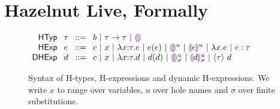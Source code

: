 
\clearpage
\newcommand{\calculusSec}{Hazelnut Live, Formally}
\section{\protect\calculusSec}
\label{sec:calculus}

\begin{figure}[!ht]
$\arraycolsep=4pt\begin{array}{rllllll}
\mathsf{HTyp} & \htau & ::= &
  b ~\vert~
  \tarr{\htau}{\htau} ~\vert~
  \tehole\\
\mathsf{HExp} & \hexp & ::= &
  c ~\vert~
  x ~\vert~
  \halam{x}{\htau}{\hexp} ~\vert~
  \hap{\hexp}{\hexp} ~\vert~
  \hehole{u} ~\vert~
  \hhole{\hexp}{u} ~\vert~
  {\hlam{x}{\hexp}} ~\vert~
  \hexp : \htau\\
 \mathsf{DHExp} & \dexp  & ::= &
  c ~\vert~
  x ~\vert~
  {\halam{x}{\htau}{\dexp}} ~\vert~
  \hap{\dexp}{\dexp} ~\vert~
  \dehole{\mvar}{\subst} ~\vert~
  \dhole{\dexp}{\mvar}{\subst} ~\vert~
  \dcast{\htau}{\dexp}\\
\end{array}$
\caption{Syntax of H-types, H-expressions and dynamic H-expressions. We write $x$ to range over variables, $u$ over hole names and $\sigma$ over finite substitutions.}
\label{fig:HTyp}
\label{fig:HExp}
\end{figure}

